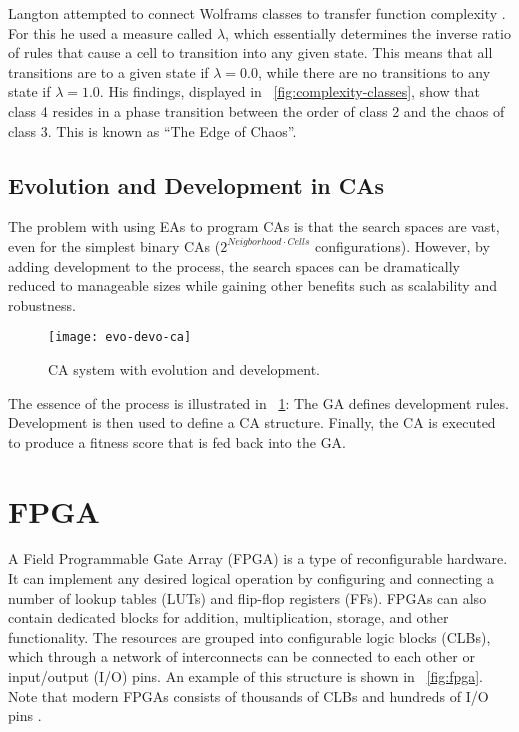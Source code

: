 Langton attempted to connect Wolframs classes to transfer function complexity \cite{langton1990edgeofchaos}.
For this he used a measure called $\lambda$, which essentially determines the inverse ratio of rules that cause a cell to transition into any given state.
This means that all transitions are to a given state if $\lambda=0.0$, while there are no transitions to any state if $\lambda=1.0$.
His findings, displayed in \figurename~\ref{fig:complexity-classes}, show that class 4 resides in a phase transition between the order of class 2 and the chaos of class 3.
This is known as ``The Edge of Chaos''.

\subsection{Evolution and Development in CAs}
\label{sec:evo-devo-ca}

The problem with using EAs to program CAs is that the search spaces are vast, even for the simplest binary CAs ($2^{Neigborhood \cdot Cells}$ configurations\footnotemark).
However, by adding development to the process, the search spaces can be dramatically reduced to manageable sizes while gaining other benefits such as scalability and robustness.


\begin{figure}[!ht]
    \centering
    \texttt{[image: evo-devo-ca]}
    \caption[CA system with evolution and development]{
        CA system with evolution and development.
    }
    \label{fig:evo-devo-ca}
\end{figure}

The essence of the process is illustrated in \figurename~\ref{fig:evo-devo-ca}:
The GA defines development rules.
Development is then used to define a CA structure.
Finally, the CA is executed to produce a fitness score that is fed back into the GA.


\section{FPGA}

A Field Programmable Gate Array (FPGA) is a type of reconfigurable hardware.
It can implement any desired logical operation by configuring and connecting a number of lookup tables (LUTs) and flip-flop registers (FFs).
FPGAs can also contain dedicated blocks for addition, multiplication, storage, and other functionality.
The resources are grouped into configurable logic blocks (CLBs), which through a network of interconnects can be connected to each other or input/output (I/O) pins.
An example of this structure is shown in \figurename~\ref{fig:fpga}.
Note that modern FPGAs consists of thousands of CLBs and hundreds of I/O pins \cite{ds160}.

